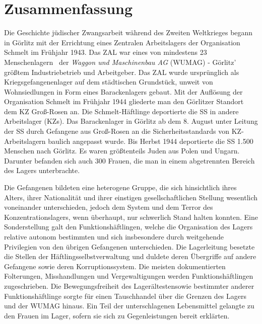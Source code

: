 \section{Zusammenfassung}
Die Geschichte jüdischer Zwangsarbeit während des Zweiten Weltkrieges begann in Görlitz mit der Errichtung eines Zentralen Arbeitslagers der Organisation Schmelt im Frühjahr 1943. Das ZAL war eines von mindestens 23 \glqq Menschenlagern\grqq~ der \emph{Waggon und Maschinenbau AG} (WUMAG) - Görlitz' größtem Industriebetrieb und Arbeitgeber. Das ZAL wurde ursprünglich als Kriegsgefangenenlager auf dem städtischen Grundstück, unweit von Wohnsiedlungen in Form eines Barackenlagers gebaut. Mit der Auflösung der Organisation Schmelt im Frühjahr 1944 gliederte man den Görlitzer Standort dem KZ Groß-Rosen an. Die Schmelt-Häftlinge deportierte die SS in andere Arbeitslager (KZs). Das Barackenlager in Görlitz ab dem 8. August unter Leitung der SS durch Gefangene aus Groß-Rosen an die Sicherheitsstandards von KZ-Arbeitslagern baulich angepasst wurde. Bis Herbst 1944 deportierte die SS 1.500 Menschen nach Görlitz. Es waren größtenteils Juden aus Polen und Ungarn. Darunter befanden sich auch 300 Frauen, die man in einem abgetrennten Bereich des Lagers unterbrachte. 

Die Gefangenen bildeten eine heterogene Gruppe, die sich hinsichtlich ihres Alters, ihrer Nationalität und ihrer einstigen gesellschaftlichen Stellung wesentlich voneinander unterschieden, jedoch dem System und dem Terror des Konzentrationslagers, wenn überhaupt, nur schwerlich Stand halten konnten. Eine Sonderstellung galt den Funktionshäftlingen, welche die Organisation des Lagers relative autonom bestimmten und sich insbesondere durch weitgehende Privilegien von den übrigen Gefangenen unterschieden. Die Lagerleitung besetzte die Stellen der Häftlingsselbstverwaltung und duldete deren Übergriffe auf andere Gefangene sowie deren Korruptionssystem. Die meisten dokumentierten Folterungen, Misshandlungen und Vergewaltigungen werden Funktionshäftlingen zugeschrieben. Die Bewegungsfreiheit des Lagerältesten\linebreak\newpage sowie bestimmter anderer Funktionshäftlinge sorgte für einen Tauschhandel über die Grenzen des Lagers und der WUMAG hinaus. Ein Teil der unterschlagenen Lebensmittel gelangte zu den Frauen im Lager, sofern sie sich zu Gegenleistungen bereit erklärten. 

